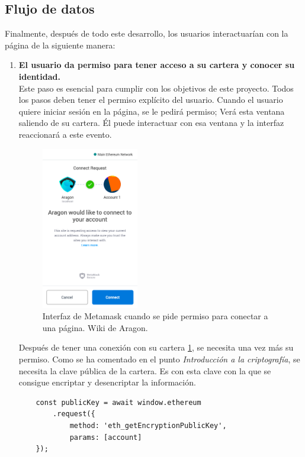 \subsection{Flujo de datos}
Finalmente, después de todo este desarrollo, los usuarios interactuarían con la página de la siguiente manera:
\begin{enumerate}
    \item \textbf{El usuario da permiso para tener acceso a su cartera y conocer su identidad.}\\
    Este paso es esencial para cumplir con los objetivos de este proyecto. Todos los pasos deben tener el permiso explícito del usuario. Cuando el usuario quiere iniciar sesión en la página, se le pedirá permiso; Verá esta ventana saliendo de su cartera. Él puede interactuar con esa ventana y la interfaz reaccionará a este evento.
    \begin{figure}[H]
        \centering
        \includegraphics[width=0.4\textwidth]{Figures/Metamask.png}
        \caption[Interfaz de Metamask]{Interfaz de Metamask cuando se pide permiso para conectar a una página. Wiki de Aragon. \cite{web:aragon}}
        \label{fg:aragon}
    \end{figure}
    Después de tener una conexión con su cartera \ref{fg:aragon}, se necesita una vez más su permiso. Como se ha comentado en el punto \textit{Introducción a la criptografía}, se necesita la clave pública de la cartera. Es con esta clave con la que se consigue encriptar y desencriptar la información.
    \begin{lstlisting}
    const publicKey = await window.ethereum
		.request({
			method: 'eth_getEncryptionPublicKey',
			params: [account]
	});
    \end{lstlisting}

\end{enumerate}
